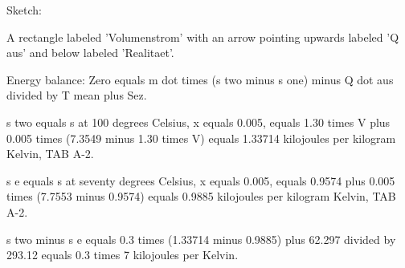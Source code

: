 Sketch:

A rectangle labeled 'Volumenstrom' with an arrow pointing upwards labeled 'Q aus' and below labeled 'Realitaet'.

Energy balance: Zero equals m dot times (s two minus s one) minus Q dot aus divided by T mean plus Sez.

s two equals s at 100 degrees Celsius, x equals 0.005, equals 1.30 times V plus 0.005 times (7.3549 minus 1.30 times V) equals 1.33714 kilojoules per kilogram Kelvin, TAB A-2.

s e equals s at seventy degrees Celsius, x equals 0.005, equals 0.9574 plus 0.005 times (7.7553 minus 0.9574) equals 0.9885 kilojoules per kilogram Kelvin, TAB A-2.

s two minus s e equals 0.3 times (1.33714 minus 0.9885) plus 62.297 divided by 293.12 equals 0.3 times 7 kilojoules per Kelvin.